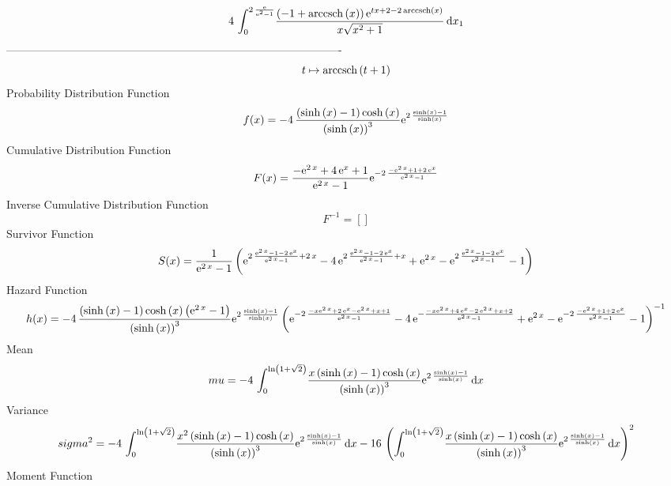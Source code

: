 \documentclass[12pt]{article}
\begin{document}
 $$4\,\int_{0}^{2\,{\frac {{\rm e}}{{{\rm e}^{2}}-1}}}\!{\frac { \left( -
1+{\rm arccsch} \left(x\right) \right) {{\rm e}^{tx+2-2\,{\rm arccsch}
 \left(x\right)}}}{x\sqrt {{x}^{2}+1}}}\,{\rm d}x_{{1}}
$$-------------------------------------------------------------------------------------------  \\$$t\mapsto {\rm arccsch} \left(t+1\right)
$$Probability Distribution Function 
$$  f(x)=-4\,{\frac { \left( \sinh \left( x \right) -1 \right) \cosh \left( x
 \right) }{ \left( \sinh \left( x \right)  \right) ^{3}}{{\rm e}^{2\,{
\frac {\sinh \left( x \right) -1}{\sinh \left( x \right) }}}}}
$$Cumulative Distribution Function  
 $$F(x)={\frac {-{{\rm e}^{2\,x}}+4\,{{\rm e}^{x}}+1}{{{\rm e}^{2\,x}}-1}{
{\rm e}^{-2\,{\frac {-{{\rm e}^{2\,x}}+1+2\,{{\rm e}^{x}}}{{{\rm e}^{2
\,x}}-1}}}}}
$$ Inverse Cumulative Distribution Function 
  $$F^{-1} = []
$$Survivor Function 
 $$ S(x)={\frac {1}{{{\rm e}^{2\,x}}-1} \left( {{\rm e}^{2\,{\frac {{{\rm e}^{2
\,x}}-1-2\,{{\rm e}^{x}}}{{{\rm e}^{2\,x}}-1}}+2\,x}}-4\,{{\rm e}^{2\,
{\frac {{{\rm e}^{2\,x}}-1-2\,{{\rm e}^{x}}}{{{\rm e}^{2\,x}}-1}}+x}}+
{{\rm e}^{2\,x}}-{{\rm e}^{2\,{\frac {{{\rm e}^{2\,x}}-1-2\,{{\rm e}^{
x}}}{{{\rm e}^{2\,x}}-1}}}}-1 \right) }
$$ Hazard Function 
 $$ h(x)=-4\,{\frac { \left( \sinh \left( x \right) -1 \right) \cosh \left( x
 \right)  \left( {{\rm e}^{2\,x}}-1 \right) }{ \left( \sinh \left( x
 \right)  \right) ^{3}}{{\rm e}^{2\,{\frac {\sinh \left( x \right) -1
}{\sinh \left( x \right) }}}} \left( {{\rm e}^{-2\,{\frac {-x{{\rm e}^
{2\,x}}+2\,{{\rm e}^{x}}-{{\rm e}^{2\,x}}+x+1}{{{\rm e}^{2\,x}}-1}}}}-
4\,{{\rm e}^{-{\frac {-x{{\rm e}^{2\,x}}+4\,{{\rm e}^{x}}-2\,{{\rm e}^
{2\,x}}+x+2}{{{\rm e}^{2\,x}}-1}}}}+{{\rm e}^{2\,x}}-{{\rm e}^{-2\,{
\frac {-{{\rm e}^{2\,x}}+1+2\,{{\rm e}^{x}}}{{{\rm e}^{2\,x}}-1}}}}-1
 \right) ^{-1}}
$$Mean 
 $$ mu=-4\,\int_{0}^{\ln  \left( 1+\sqrt {2} \right) }\!{\frac {x \left( 
\sinh \left( x \right) -1 \right) \cosh \left( x \right) }{ \left( 
\sinh \left( x \right)  \right) ^{3}}{{\rm e}^{2\,{\frac {\sinh
 \left( x \right) -1}{\sinh \left( x \right) }}}}}\,{\rm d}x
$$ Variance 
 $$ sigma^2 = -4\,\int_{0}^{\ln  \left( 1+\sqrt {2} \right) }\!{\frac {{x}^{2}
 \left( \sinh \left( x \right) -1 \right) \cosh \left( x \right) }{
 \left( \sinh \left( x \right)  \right) ^{3}}{{\rm e}^{2\,{\frac {
\sinh \left( x \right) -1}{\sinh \left( x \right) }}}}}\,{\rm d}x-16\,
 \left( \int_{0}^{\ln  \left( 1+\sqrt {2} \right) }\!{\frac {x \left( 
\sinh \left( x \right) -1 \right) \cosh \left( x \right) }{ \left( 
\sinh \left( x \right)  \right) ^{3}}{{\rm e}^{2\,{\frac {\sinh
 \left( x \right) -1}{\sinh \left( x \right) }}}}}\,{\rm d}x \right) ^
{2}
$$Moment Function 
\end{document}
